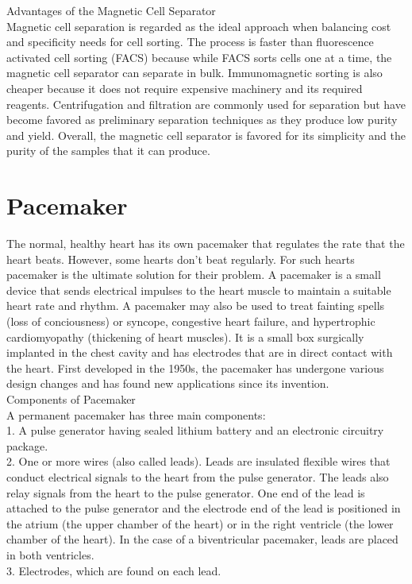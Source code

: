 \documentclass[12pt]{article}
\begin{document}
Advantages of the Magnetic Cell Separator\\
Magnetic cell separation is regarded as the ideal approach when balancing cost and specificity needs for cell sorting. The process is faster than fluorescence activated cell sorting (FACS) because while FACS sorts cells one at a time, the magnetic cell separator can separate in bulk. Immunomagnetic sorting is also cheaper because it does not require expensive machinery and its required reagents. Centrifugation and filtration are commonly used for separation but have become favored as preliminary separation techniques as they produce low purity and yield. Overall, the magnetic cell separator is favored for its simplicity and the purity of the samples that it can produce.
 
\clearpage

\section{Pacemaker}

The normal, healthy heart has its own pacemaker that regulates the rate that the heart beats. However, some hearts don’t beat regularly. For such hearts pacemaker is the ultimate solution for their problem. A pacemaker is a small device that sends electrical impulses to the heart muscle to maintain a suitable heart rate and rhythm. A pacemaker may also be used to treat fainting spells (loss of conciousness) or syncope, congestive heart failure, and hypertrophic cardiomyopathy (thickening of heart muscles). It is a small box surgically implanted in the chest cavity and has electrodes that are in direct contact with the heart. First developed in the 1950s, the pacemaker has undergone various design changes and has found new applications since its invention.\\

Components of Pacemaker\\

A permanent pacemaker has three main components:\\
1. A pulse generator having sealed lithium battery and an electronic circuitry package.\\
2. One or more wires (also called leads). Leads are insulated flexible wires that conduct electrical signals to the heart from the pulse generator. The leads also relay signals from the heart to the pulse generator. One end of the lead is attached to the pulse generator and the electrode end of the lead is positioned in the atrium (the upper chamber of the heart) or in the right ventricle (the lower chamber of the heart). In the case of a biventricular pacemaker, leads are placed in both ventricles.\\
3. Electrodes, which are found on each lead.\\\\\\
\end{document}
